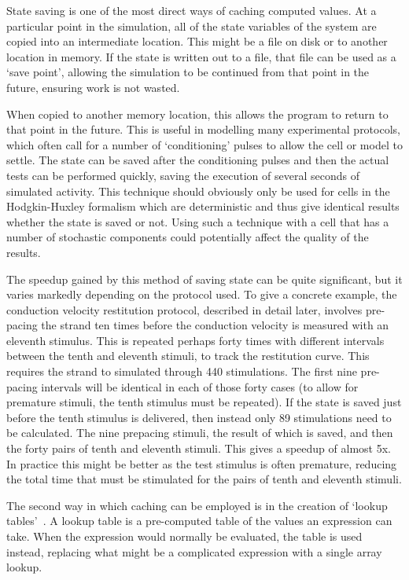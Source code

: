 State saving is one of the most direct ways of caching computed values.  At a
particular point in the simulation, all of the state variables of the
system are copied into an intermediate location.  This might be a file on disk or
to another location in memory.  If the state is written out to a file, that file can
be used as a `save point', allowing the simulation to be continued from that
point in the future, ensuring work is not wasted.

When copied to another memory location, this allows the program to return to
that point in the future.  This is useful in modelling many experimental
protocols, which often call for a number of `conditioning' pulses to allow the
cell or model to settle.  The state can be saved after the conditioning pulses
and then the actual tests can be performed quickly, saving the execution of
several seconds of simulated activity.  This technique should obviously only be
used for cells in the Hodgkin-Huxley formalism which are deterministic and thus
give identical results whether the state is saved or not.  Using such a
technique with a cell that has a number of stochastic components could
potentially affect the quality of the results.

The speedup gained by this method of saving state can be quite significant, but
it varies markedly depending on the protocol used.
To give a concrete example, the conduction velocity restitution protocol,
described in detail later, involves pre-pacing the strand ten times before the
conduction velocity is measured with an eleventh stimulus.
This is repeated perhaps forty times with different intervals between the tenth
and eleventh stimuli, to track the restitution curve.
This requires the strand to simulated through 440 stimulations.
The first nine pre-pacing intervals will be identical in each of those forty
cases (to allow for premature stimuli, the tenth stimulus must be repeated).
If the state is saved just before the tenth stimulus is delivered, then instead
only 89 stimulations need to be calculated.
The nine prepacing stimuli, the result of which is saved, and then the forty
pairs of tenth and eleventh stimuli.
This gives a speedup of almost 5x.
In practice this might be better as the test
stimulus is often premature, reducing the total time that must be stimulated for
the pairs of tenth and eleventh stimuli.


The second way in which caching can be employed is in the creation of `lookup
tables'~\cite{Victorri1985,Cooper2006}.
A lookup table is a pre-computed table of the values an expression can
take.
When the expression would normally be evaluated, the table is used
instead, replacing what might be a complicated expression with a single array
lookup.

